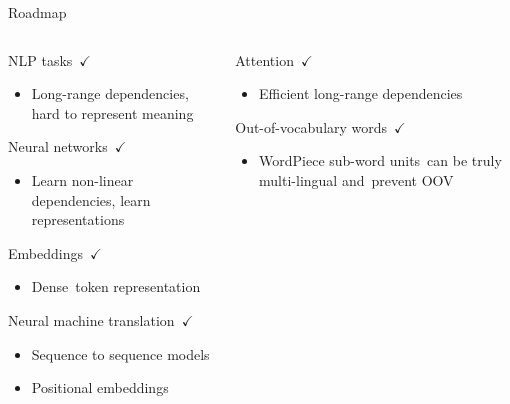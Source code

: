 \documentclass[12pt]{beamer}
\begin{document}
\begin{frame}{Roadmap}
	
	\begin{columns}
		
		\begin{column}{0.5\linewidth}
			
			
			NLP tasks $\checkmark$
			
			\begin{itemize}
				\item {\scriptsize Long-range dependencies, hard to represent meaning}
			\end{itemize}
			
			Neural networks $\checkmark$
			
			\begin{itemize}
				\item {\scriptsize Learn non-linear dependencies, learn representations}
			\end{itemize}
			
			Embeddings $\checkmark$
			
			\begin{itemize}
				\item {\scriptsize Dense token representation}
			\end{itemize}
			
			Neural machine translation $\checkmark$
			
			\begin{itemize}
				\item {\scriptsize Sequence to sequence models}
				\item {\scriptsize Positional embeddings}
			\end{itemize}
			
		\end{column}
		
		\begin{column}{0.5\linewidth}
			
			Attention $\checkmark$
			
			\begin{itemize}
				\item {\scriptsize Efficient long-range dependencies}
			\end{itemize}
			
			
			Out-of-vocabulary words $\checkmark$
			
			\begin{itemize}
				\item {\scriptsize WordPiece sub-word units can be truly multi-lingual and prevent OOV}
			\end{itemize}
			
			
			
		\end{column}
		
	\end{columns}
	
\end{frame}
\end{document}
